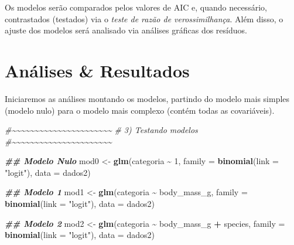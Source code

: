 \documentclass[
]{book}
\newenvironment{Shaded}{\begin{snugshade}}{\end{snugshade}}
\newcommand{\AttributeTok}[1]{\textcolor[rgb]{0.13,0.29,0.53}{#1}}
\newcommand{\CommentTok}[1]{\textcolor[rgb]{0.56,0.35,0.01}{\textit{#1}}}
\newcommand{\DecValTok}[1]{\textcolor[rgb]{0.00,0.00,0.81}{#1}}
\newcommand{\DocumentationTok}[1]{\textcolor[rgb]{0.56,0.35,0.01}{\textbf{\textit{#1}}}}
\newcommand{\FunctionTok}[1]{\textcolor[rgb]{0.13,0.29,0.53}{\textbf{#1}}}
\newcommand{\NormalTok}[1]{#1}
\newcommand{\OtherTok}[1]{\textcolor[rgb]{0.56,0.35,0.01}{#1}}
\newcommand{\SpecialCharTok}[1]{\textcolor[rgb]{0.81,0.36,0.00}{\textbf{#1}}}
\newcommand{\StringTok}[1]{\textcolor[rgb]{0.31,0.60,0.02}{#1}}
\begin{document}
Os modelos serão comparados pelos valores de AIC e, quando necessário, contrastados (testados) via o \emph{teste de razão de verossimilhança}. Além disso, o ajuste dos modelos será analisado via análises gráficas dos resíduos.

\section{Análises \& Resultados}\label{anuxe1lises-resultados}

Iniciaremos as análises montando os modelos, partindo do modelo mais simples (modelo nulo) para o modelo mais complexo (contém todas as covariáveis).

\begin{Shaded}
\begin{Highlighting}[]
\CommentTok{\#\textasciitilde{}\textasciitilde{}\textasciitilde{}\textasciitilde{}\textasciitilde{}\textasciitilde{}\textasciitilde{}\textasciitilde{}\textasciitilde{}\textasciitilde{}\textasciitilde{}\textasciitilde{}\textasciitilde{}\textasciitilde{}\textasciitilde{}\textasciitilde{}\textasciitilde{}\textasciitilde{}\textasciitilde{}\textasciitilde{}\textasciitilde{}\textasciitilde{}}
\CommentTok{\# 3) Testando modelos}
\CommentTok{\#\textasciitilde{}\textasciitilde{}\textasciitilde{}\textasciitilde{}\textasciitilde{}\textasciitilde{}\textasciitilde{}\textasciitilde{}\textasciitilde{}\textasciitilde{}\textasciitilde{}\textasciitilde{}\textasciitilde{}\textasciitilde{}\textasciitilde{}\textasciitilde{}\textasciitilde{}\textasciitilde{}\textasciitilde{}\textasciitilde{}\textasciitilde{}\textasciitilde{}}

\DocumentationTok{\#\# Modelo Nulo}
\NormalTok{mod0 }\OtherTok{\textless{}{-}} \FunctionTok{glm}\NormalTok{(categoria }\SpecialCharTok{\textasciitilde{}} \DecValTok{1}\NormalTok{,}
            \AttributeTok{family =} \FunctionTok{binomial}\NormalTok{(}\AttributeTok{link =} \StringTok{"logit"}\NormalTok{),}
            \AttributeTok{data =}\NormalTok{ dados2)}

\DocumentationTok{\#\# Modelo 1}
\NormalTok{mod1 }\OtherTok{\textless{}{-}} \FunctionTok{glm}\NormalTok{(categoria }\SpecialCharTok{\textasciitilde{}}\NormalTok{ body\_mass\_g,}
            \AttributeTok{family =} \FunctionTok{binomial}\NormalTok{(}\AttributeTok{link =} \StringTok{"logit"}\NormalTok{),}
            \AttributeTok{data =}\NormalTok{ dados2)}

\DocumentationTok{\#\# Modelo 2}
\NormalTok{mod2 }\OtherTok{\textless{}{-}} \FunctionTok{glm}\NormalTok{(categoria }\SpecialCharTok{\textasciitilde{}}\NormalTok{ body\_mass\_g }\SpecialCharTok{+}\NormalTok{ species,}
            \AttributeTok{family =} \FunctionTok{binomial}\NormalTok{(}\AttributeTok{link =} \StringTok{"logit"}\NormalTok{),}
            \AttributeTok{data =}\NormalTok{ dados2)}


\end{Highlighting}
\end{Shaded}
\end{document}
